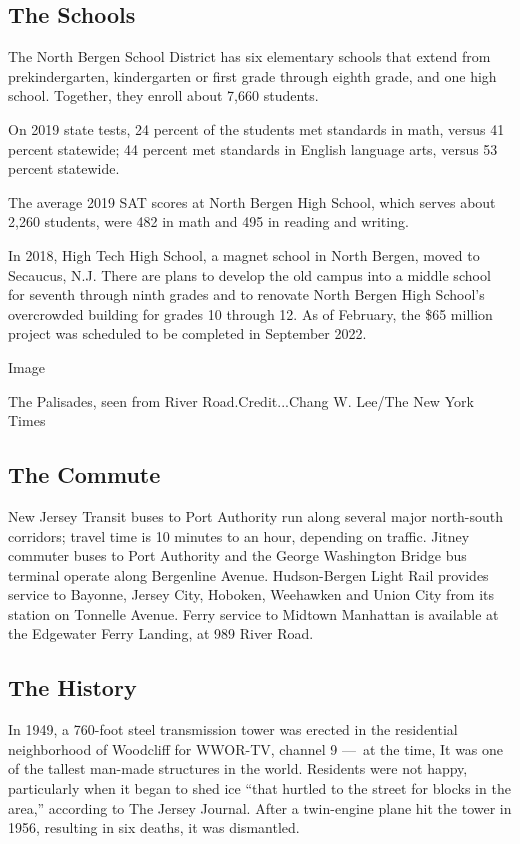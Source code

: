 \hypertarget{the-schools}{%
\subsection{The Schools}\label{the-schools}}

The North Bergen School District has six elementary schools that extend
from prekindergarten, kindergarten or first grade through eighth grade,
and one high school. Together, they enroll about 7,660 students.

On 2019 state tests, 24 percent of the students met standards in math,
versus 41 percent statewide; 44 percent met standards in English
language arts, versus 53 percent statewide.

The average 2019 SAT scores at North Bergen High School, which serves
about 2,260 students, were 482 in math and 495 in reading and writing.

In 2018, High Tech High School, a magnet school in North Bergen, moved
to Secaucus, N.J. There are plans to develop the old campus into a
middle school for seventh through ninth grades and to renovate North
Bergen High School's overcrowded building for grades 10 through 12. As
of February, the \$65 million project was scheduled to be completed in
September 2022.

Image

The Palisades, seen from River Road.Credit...Chang W. Lee/The New York
Times

\hypertarget{the-commute}{%
\subsection{The Commute}\label{the-commute}}

New Jersey Transit buses to Port Authority run along several major
north-south corridors; travel time is 10 minutes to an hour, depending
on traffic. Jitney commuter buses to Port Authority and the George
Washington Bridge bus terminal operate along Bergenline Avenue.
Hudson-Bergen Light Rail provides service to Bayonne, Jersey City,
Hoboken, Weehawken and Union City from its station on Tonnelle Avenue.
Ferry service to Midtown Manhattan is available at the Edgewater Ferry
Landing, at 989 River Road.

\hypertarget{the-history}{%
\subsection{The History}\label{the-history}}

In 1949, a 760-foot steel transmission tower was erected in the
residential neighborhood of Woodcliff for WWOR-TV, channel 9 ---~at the
time, It was one of the tallest man-made structures in the world.
Residents were not happy, particularly when it began to shed ice ``that
hurtled to the street for blocks in the area,'' according to The Jersey
Journal. After a twin-engine plane hit the tower in 1956, resulting in
six deaths, it was dismantled.

